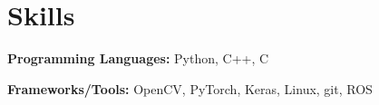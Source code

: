 \documentclass[letterpaper,11pt]{article}
\makeatletter
\newcommand{\JobSubheading}[4]{
  \vspace{-1pt}
    \begin{tabular*}{0.97\textwidth}[t]{l@{\extracolsep{\fill}}r}
      \textbf{#1} & #2  \\
      \textit{\small#3} & \textit{\small #4} \\
    \end{tabular*}\vspace{-5pt}
}
\makeatother
\begin{document}
        
    \begin{comment}
    
    \JobSubheading
      {Pharos Lab, The University of Texas at Austin}{Austin, TX}
      {Lab Assistant}{Jan 2014 - May 2014}
      \vspace{0pt}
      \begin{itemize}
        \item Helped setup robots in Linux and ROS
      \end{itemize}
    
    \JobSubheading
      {Sanger Learning Center, The University of Texas at Austin}{Austin, TX}
      {Undergraduate Tutor}{Sep 2013 - Sep 2014}
      \vspace{0pt}
      \begin{itemize}
        \item Tutored peers in Calculus and French
      \end{itemize}
    
    \JobSubheading
      {ECE Department, The University of Texas at Austin}{Austin, TX}
      {Graduate Teaching Assistant}{Aug 2015 - Dec 2016}
      \vspace{0pt}
      \begin{itemize}
        \item Certified TA for undergraduate Signals and Systems course
      
    \end{comment}
      

\section{\color{BlueViolet} Skills}

      \small \textbf{Programming Languages:} Python, C++, C
      \vspace{1pt}
      
      \textbf{Frameworks/Tools:} OpenCV, PyTorch, Keras, Linux, git, ROS
      \vspace{1pt}

      \vspace{1pt}
      
\end{document}
